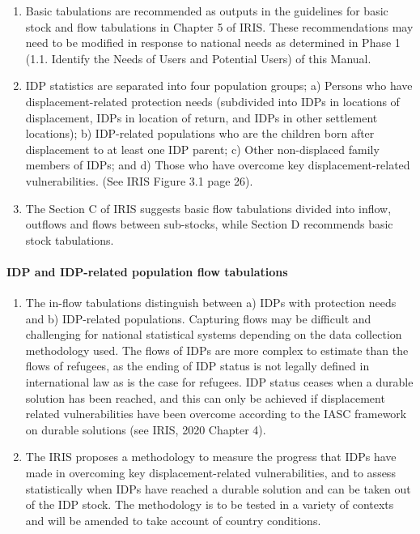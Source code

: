 \documentclass[
]{article}
\begin{document}
\begin{enumerate}
\def\labelenumi{\arabic{enumi}.}
\setcounter{enumi}{63}
\item
  Basic tabulations are recommended as outputs in the guidelines for
  basic stock and flow tabulations in Chapter 5 of IRIS. These
  recommendations may need to be modified in response to national
  needs as determined in Phase 1 (1.1. Identify the Needs of Users and
  Potential Users) of this Manual.
\item
  IDP statistics are separated into four population groups; a) Persons
  who have displacement-related protection needs (subdivided into IDPs
  in locations of displacement, IDPs in location of return, and IDPs
  in other settlement locations); b) IDP-related populations who are
  the children born after displacement to at least one IDP parent; c)
  Other non-displaced family members of IDPs; and d) Those who have
  overcome key displacement-related vulnerabilities. (See IRIS Figure
  3.1 page 26).
\item
  The Section C of IRIS suggests basic flow tabulations divided into
  inflow, outflows and flows between sub-stocks, while Section D
  recommends basic stock tabulations.
\end{enumerate}

\hypertarget{idp-and-idp-related-population-flow-tabulations}{%
\paragraph{IDP and IDP-related population flow tabulations}\label{idp-and-idp-related-population-flow-tabulations}}

\begin{enumerate}
\def\labelenumi{\arabic{enumi}.}
\setcounter{enumi}{66}
\item
  The in-flow tabulations distinguish between a) IDPs with protection
  needs and b) IDP-related populations. Capturing flows may be
  difficult and challenging for national statistical systems depending
  on the data collection methodology used. The flows of IDPs are more
  complex to estimate than the flows of refugees, as the ending of IDP
  status is not legally defined in international law as is the case
  for refugees. IDP status ceases when a durable solution has been
  reached, and this can only be achieved if displacement related
  vulnerabilities have been overcome according to the IASC framework
  on durable solutions (see IRIS, 2020 Chapter 4).
\item
  The IRIS proposes a methodology to measure the progress that IDPs
  have made in overcoming key displacement-related vulnerabilities,
  and to assess statistically when IDPs have reached a durable
  solution and can be taken out of the IDP stock. The methodology is
  to be tested in a variety of contexts and will be amended to take
  account of country conditions.
\end{enumerate}
\end{document}
